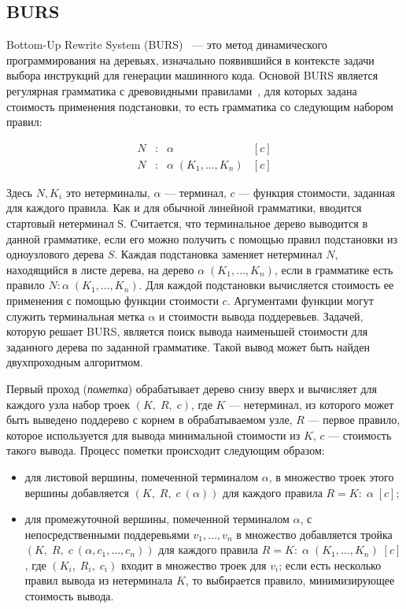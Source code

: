 \subsection{BURS}

Bottom-Up Rewrite System (BURS)~\cite{burs} --- это метод динамического
программирования на деревьях, изначально появившийся в контексте задачи выбора
инструкций для генерации машинного кода. Основой BURS является
регулярная грамматика с древовидными правилами~\cite{tata}, для которых задана
стоимость применения подстановки,
то есть грамматика со следующим набором правил: 

$$
\begin{array}{rcll}
  N &:& \alpha& [c]\\
  N &:& \alpha\; (K_1,\dots,K_n)& [c]
\end{array}
$$

Здесь $N, K_i$ это нетерминалы, $\alpha$ --- терминал,
$c$ --- функция стоимости, заданная для каждого правила.
Как и для обычной линейной грамматики, вводится стартовый
нетерминал S. Считается, что терминальное дерево выводится в
данной грамматике, если его можно получить с помощью правил
подстановки из одноузлового дерева $S$.
Каждая подстановка заменяет нетерминал $N$, находящийся в листе дерева, на дерево 
$\alpha\;(K_1,\dots,K_n)$, если в грамматике есть правило
$N:\alpha\;(K_1,\dots,K_n)$. 
Для каждой подстановки вычисляется стоимость ее применения с помощью
функции стоимости $c$.
Аргументами функции могут служить терминальная метка $\alpha$ и стоимости
вывода поддеревьев.
Задачей, которую решает BURS, является поиск вывода наименьшей стоимости
для заданного дерева по заданной грамматике.
Такой вывод может быть найден двухпроходным алгоритмом.

Первый проход (\emph{пометка}) обрабатывает дерево снизу вверх и вычисляет
для каждого узла набор троек $(K,\;R,\;c)$, где $K$ --- нетерминал, из которого может быть
выведено поддерево с корнем в обрабатываемом узле,
$R$ --- первое правило, которое используется для вывода минимальной стоимости из $K$,
$c$ --- стоимость такого вывода.
Процесс пометки происходит следующим образом:

\begin{itemize}
\item для листовой вершины, помеченной терминалом $\alpha$, в множество троек
этого вершины добавляется $(K,\;R,\;c\:(\alpha))$ для каждого правила $R=K:\;\alpha\;[c]$;
\item для промежуточной вершины, помеченной терминалом $\alpha$,
с непосредственными поддеревьями $v_1,\dots,v_n$
в множество добавляется тройка $(K,\;R,\;c\:(\alpha,c_1,\dots,c_n))$ для каждого правила
$R=K:\;\alpha\;(K_1,\dots,K_n)\;[c]$, где $(K_i,\;R_i,\;c_i)$ входит в множество троек для
$v_i$; если есть несколько правил вывода из нетерминала $K$, то выбирается правило,
минимизирующее стоимость вывода.
\end{itemize}

